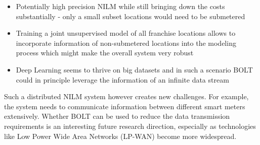 \begin{description}
\begin{itemize}
\item Potentially high precision NILM while still bringing down the costs substantially - only a small subset locations would need to be submetered
\item Training a joint unsupervised model of all franchise locations allows to incorporate information of non-submetered locations into the modeling process which might make the overall system very robust
\item Deep Learning seems to thrive on big datasets and in such a scenario BOLT could in principle leverage the information of an infinite data stream
\end{itemize}
Such a distributed NILM system however creates new challenges. For example, the system needs to communicate information between different smart meters extensively. Whether BOLT can be used to reduce the data transmission requirements is an interesting future research direction, especially as technologies like Low Power Wide Area Networks (LP-WAN) become more widespread.
\end{description}